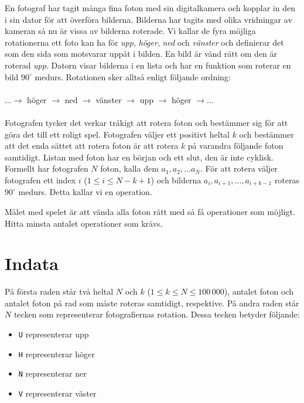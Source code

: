 En fotograf har tagit många fina foton med sin digitalkamera och kopplar in den
i sin dator för att överföra bilderna. Bilderna har tagits med olika vridningar
av kameran så nu är vissa av bilderna roterade. Vi kallar de fyra möjliga
rotationerna ett foto kan ha för \emph{upp}, \emph{höger}, \emph{ned} och \emph{vänster} och
definierar det som den sida som motsvarar uppåt i bilden. En bild är vänd rätt
om den är roterad \emph{upp}. Datorn visar bilderna i en lista och har en funktion
som roterar en bild $90^\circ$ medurs. Rotationen sker alltså enligt följande ordning:
\\
\\
$\dots \rightarrow$ höger $\rightarrow$ ned $\rightarrow$ vänster $\rightarrow$
upp $\rightarrow$ höger $\rightarrow \dots$
\\
\\
Fotografen tycker det verkar tråkigt att rotera foton och bestämmer sig för att
göra det till ett roligt spel. Fotografen väljer ett positivt heltal $k$ och
bestämmer att det enda sättet att rotera foton är att rotera $k$ på varandra
följande foton samtidigt. Listan med foton har en början och ett slut, den är
inte cyklisk. Formellt har fotografen $N$ foton, kalla dem $a_1, a_2, \dots
a_N$. För att rotera väljer fotografen ett index $i$ ($1 \leq i \leq N-k+1$)
och bilderna $a_i, a_{i+1}, ... , a_{i+k-1}$ roteras $90^\circ$ medurs. Detta kallar vi en
operation.

Målet med spelet är att vända alla foton rätt med så få operationer som
möjligt. Hitta minsta antalet operationer som krävs.

\section*{Indata}
På första raden står två heltal $N$ och $k$ ($1 \leq k \leq N \leq 100\,000$),
antalet foton och antalet foton på rad som måste roteras samtidigt, respektive.
På andra raden står $N$ tecken som representerar fotografiernas rotation. Dessa
tecken betyder följande:

\begin{itemize}
\item \texttt{U} representerar upp
\item \texttt{H} representerar höger
\item \texttt{N} representerar ner
\item \texttt{V} representerar väster
\end{itemize}

